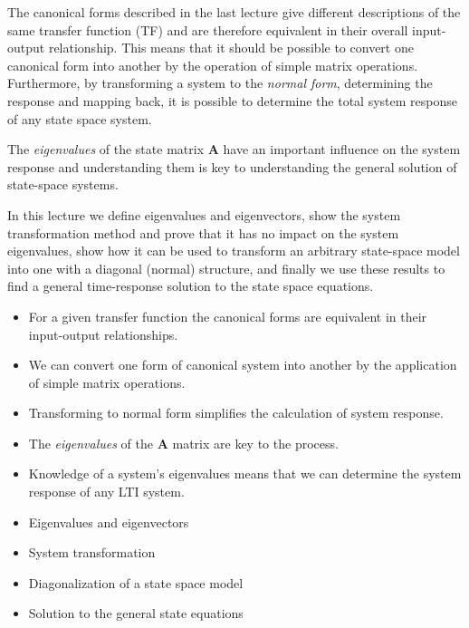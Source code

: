\def\FileDate{10/01/31}
\def\FileVersion{1.0}


The canonical forms described in the last lecture give different descriptions of the same transfer function (TF) and are therefore equivalent in their overall input-output relationship. This means that it should be possible to convert one canonical form into another by the operation of simple matrix operations. Furthermore, by transforming a system to the \emph{normal form}, determining the response and mapping back, it is possible to determine the total system response of any state space system.

The \emph{eigenvalues} of the state matrix $\mathbf{A}$ have an important influence on the system response and understanding them is key to understanding the general solution of state-space systems.

In this lecture we define eigenvalues and eigenvectors, show the system transformation method and prove that it has no impact on the system eigenvalues, show how it can be used to transform an arbitrary state-space model into one with a diagonal (normal) structure, and finally we use these results to find a general time-response solution to the state space equations.

\ifslidesonly
\begin{slide}
\begin{itemize}
	\item For a given transfer function the canonical forms are equivalent in their input-output relationships.
	\item We can convert one form of canonical system into another by the application of simple matrix operations.
	\item Transforming to normal form simplifies the calculation of system response.
	\item The \emph{eigenvalues} of the $\mathbf{A}$ matrix are key to the process.
	\item Knowledge of a system's eigenvalues means that we can determine the system response of any LTI system.
\end{itemize}   
\end{slide}
\begin{slide}
\begin{itemize}
	\item Eigenvalues and eigenvectors
	\item System transformation
	\item Diagonalization of a state space model
	\item Solution to the general state equations
\end{itemize}
\end{slide}
\fi

